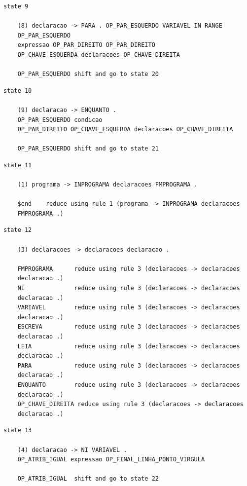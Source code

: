 \documentclass[a4paper,12pt]{article}
\begin{document}
\begin{verbatim}
state 9

    (8) declaracao -> PARA . OP_PAR_ESQUERDO VARIAVEL IN RANGE 
    OP_PAR_ESQUERDO 
    expressao OP_PAR_DIREITO OP_PAR_DIREITO 
    OP_CHAVE_ESQUERDA declaracoes OP_CHAVE_DIREITA

    OP_PAR_ESQUERDO shift and go to state 20
\end{verbatim}

\begin{verbatim}
state 10

    (9) declaracao -> ENQUANTO . 
    OP_PAR_ESQUERDO condicao 
    OP_PAR_DIREITO OP_CHAVE_ESQUERDA declaracoes OP_CHAVE_DIREITA

    OP_PAR_ESQUERDO shift and go to state 21
\end{verbatim}

\begin{verbatim}
state 11

    (1) programa -> INPROGRAMA declaracoes FMPROGRAMA .

    $end    reduce using rule 1 (programa -> INPROGRAMA declaracoes 
    FMPROGRAMA .)
\end{verbatim}

\begin{verbatim}
state 12

    (3) declaracoes -> declaracoes declaracao .

    FMPROGRAMA      reduce using rule 3 (declaracoes -> declaracoes 
    declaracao .)
    NI              reduce using rule 3 (declaracoes -> declaracoes 
    declaracao .)
    VARIAVEL        reduce using rule 3 (declaracoes -> declaracoes 
    declaracao .)
    ESCREVA         reduce using rule 3 (declaracoes -> declaracoes 
    declaracao .)
    LEIA            reduce using rule 3 (declaracoes -> declaracoes 
    declaracao .)
    PARA            reduce using rule 3 (declaracoes -> declaracoes 
    declaracao .)
    ENQUANTO        reduce using rule 3 (declaracoes -> declaracoes 
    declaracao .)
    OP_CHAVE_DIREITA reduce using rule 3 (declaracoes -> declaracoes 
    declaracao .)

\end{verbatim}

\begin{verbatim}
state 13

    (4) declaracao -> NI VARIAVEL . 
    OP_ATRIB_IGUAL expressao OP_FINAL_LINHA_PONTO_VIRGULA

    OP_ATRIB_IGUAL  shift and go to state 22

\end{verbatim}
\end{document}
